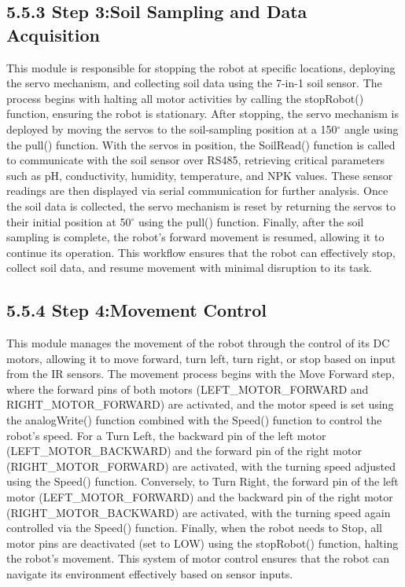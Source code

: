 \documentclass{book} %
\begin{document}
\noindent 
\subsection{5.5.3 Step 3:Soil Sampling and Data Acquisition}

\noindent This module is responsible for stopping the robot at specific locations, deploying the servo mechanism, and collecting soil data using the 7-in-1 soil sensor. The process begins with halting all motor activities by calling the stopRobot() function, ensuring the robot is stationary. After stopping, the servo mechanism is deployed by moving the servos to the soil-sampling position at a 150$\mathrm{{}^\circ}$ angle using the pull() function. With the servos in position, the SoilRead() function is called to communicate with the soil sensor over RS485, retrieving critical parameters such as pH, conductivity, humidity, temperature, and NPK values. These sensor readings are then displayed via serial communication for further analysis. Once the soil data is collected, the servo mechanism is reset by returning the servos to their initial position at 50$\mathrm{{}^\circ}$ using the pull() function. Finally, after the soil sampling is complete, the robot's forward movement is resumed, allowing it to continue its operation. This workflow ensures that the robot can effectively stop, collect soil data, and resume movement with minimal disruption to its task.

\noindent 
\subsection{}

\noindent 
\subsection{5.5.4 Step 4:Movement Control}

\noindent This module manages the movement of the robot through the control of its DC motors, allowing it to move forward, turn left, turn right, or stop based on input from the IR sensors. The movement process begins with the Move Forward step, where the forward pins of both motors (LEFT\_MOTOR\_FORWARD and RIGHT\_MOTOR\_FORWARD) are activated, and the motor speed is set using the analogWrite() function combined with the Speed() function to control the robot's speed. For a Turn Left, the backward pin of the left motor (LEFT\_MOTOR\_BACKWARD) and the forward pin of the right motor (RIGHT\_MOTOR\_FORWARD) are activated, with the turning speed adjusted using the Speed() function. Conversely, to Turn Right, the forward pin of the left motor (LEFT\_MOTOR\_FORWARD) and the backward pin of the right motor (RIGHT\_MOTOR\_BACKWARD) are activated, with the turning speed again controlled via the Speed() function. Finally, when the robot needs to Stop, all motor pins are deactivated (set to LOW) using the stopRobot() function, halting the robot's movement. This system of motor control ensures that the robot can navigate its environment effectively based on sensor inputs.\textbf{}
\end{document}
